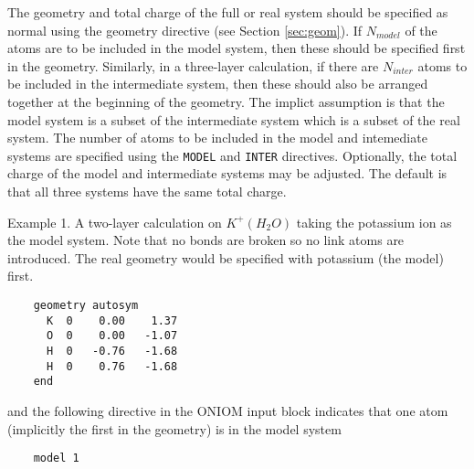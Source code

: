 The geometry and total charge of the full or real system should be
specified as normal using the geometry directive (see Section
\ref{sec:geom}).  If $N_{model}$ of the atoms are to be included in
the model system, then these should be specified first in the
geometry.  Similarly, in a three-layer calculation, if there are
$N_{inter}$ atoms to be included in the intermediate system, then
these should also be arranged together at the beginning of the
geometry.  The implict assumption is that the model system is a subset
of the intermediate system which is a subset of the real system.  The
number of atoms to be included in the model and intemediate systems
are specified using the \verb+MODEL+ and \verb+INTER+ directives.
Optionally, the total charge of the model and intermediate systems may
be adjusted.  The default is that all three systems have the same
total charge.

Example 1.  A two-layer calculation on $K^{+}(H_2O)$ taking the
potassium ion as the model system.  Note that no bonds are broken so
no link atoms are introduced.  The real geometry would be specified
with potassium (the model) first.
\begin{verbatim}
    geometry autosym
      K  0    0.00    1.37
      O  0    0.00   -1.07
      H  0   -0.76   -1.68
      H  0    0.76   -1.68
    end
\end{verbatim}
and the following directive in the ONIOM input block indicates that
one atom (implicitly the first in the geometry) is in the model system
\begin{verbatim}
    model 1
\end{verbatim}

